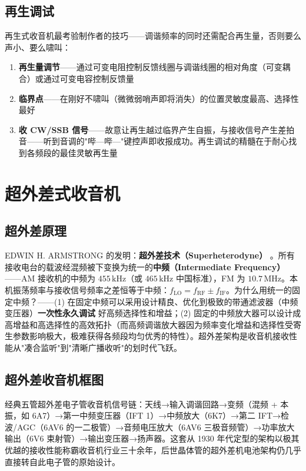 \documentclass[12pt,UTF8]{ctexbook}
\begin{document}
\subsection{再生调试}

再生式收音机最考验制作者的技巧——调谐频率的同时还需配合再生量，否则要么声小、要么啸叫：
\begin{enumerate}
\item \textbf{再生量调节}——通过可变电阻控制反馈线圈与调谐线圈的相对角度（可变耦合）或通过可变电容控制反馈量
\item \textbf{临界点}——在刚好不啸叫（微微弱哨声即将消失）的位置灵敏度最高、选择性最好
\item \textbf{收 CW/SSB 信号}——故意让再生越过临界产生自振，与接收信号产生差拍音——听到音调的"哔—哔—"键控声即收报成功。再生调试的精髓在于耐心找到各频段的最佳灵敏再生量
\end{enumerate}

\section{超外差式收音机}
\label{sec:tube_superheterodyne}

\subsection{超外差原理}

EDWIN H. ARMSTRONG 的发明：\textbf{超外差技术（Superheterodyne）} 。所有接收电台的载波经混频被下变换为统一的\textbf{中频（Intermediate Frequency）}——AM 接收机的中频为 $455\,\mathrm{kHz}$（或 $465\,\mathrm{kHz}$ 中国标准），FM 为 $10.7\,\mathrm{MHz}$。本机振荡频率与接收信号频率之差恒等于中频：$f_\mathrm{LO} = f_\mathrm{RF} \pm f_\mathrm{IF}$。为什么用统一的固定中频？——(1) 在固定中频可以采用设计精良、优化到极致的带通滤波器（中频变压器）\textbf{一次性永久调试} 好高频选择性和增益；(2) 固定的中频放大器可以设计成高增益和高选择性的高效拓扑（而高频调谐放大器因为频率变化增益和选择性受寄生参数影响极大，极难获得各频段均匀优秀的特性）。超外差架构是收音机接收性能从"凑合监听"到"清晰广播收听"的划时代飞跃。

\subsection{超外差收音机框图}

经典五管超外差电子管收音机信号链：天线→输入调谐回路→变频（混频 + 本振，如 6A7）→第一中频变压器（IFT 1）→中频放大（6K7）→第二 IFT→检波/AGC（6AV6 的一二极管）→音频电压放大（6AV6 三极音频管）→功率放大输出（6V6 束射管）→输出变压器→扬声器。这套从 1930 年代定型的架构以极其优越的接收性能称霸收音机行业三十余年，后世晶体管的超外差机电池架构仍几乎直接转自此电子管的原始设计。
\end{document}
